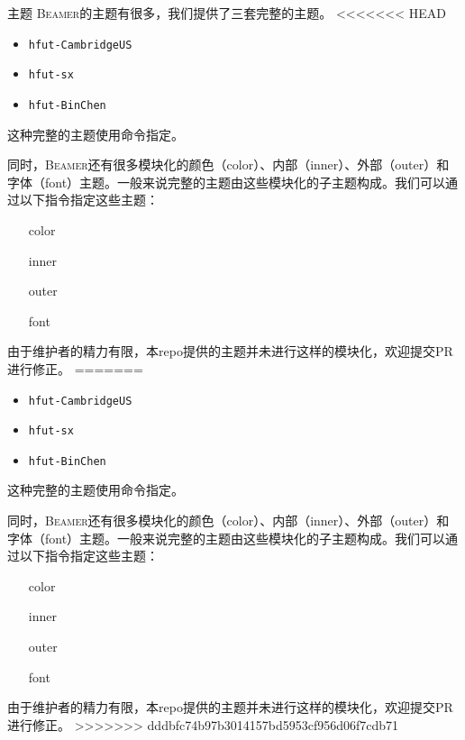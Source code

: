 \documentclass[aspectratio=169]{beamer}
\newcommand{\Beamer}{\textsc{Beamer}}
\newcommand{\enableindent}{\setlength{\parskip}{6pt}\setlength{\parindent}{2em}}
\begin{document}
\begin{frame}{主题}
	\enableindent
	\Beamer 的主题有很多，我们提供了三套完整的主题。
<<<<<<< HEAD
	\begin{itemize}
		\item \texttt{hfut-CambridgeUS}
		\item \texttt{hfut-sx}
		\item \texttt{hfut-BinChen}
	\end{itemize}

	这种完整的主题使用\texttt{\usetheme}命令指定。

	\framebreak

	同时，\Beamer 还有很多模块化的颜色（color）、内部（inner）、外部（outer）和字体（font）主题。一般来说完整的主题由这些模块化的子主题构成。我们可以通过以下指令指定这些主题：
	\begin{itemize}
		\item[color] \texttt{\usecolortheme}
		\item[inner] \texttt{\useinnertheme}
		\item[outer] \texttt{\useoutertheme}
		\item[font] \texttt{\usefonttheme}
	\end{itemize}

	由于维护者的精力有限，本repo提供的主题并未进行这样的模块化，欢迎提交PR进行修正。
=======
\begin{itemize}
	\item \texttt{hfut-CambridgeUS}
	\item \texttt{hfut-sx}
	\item \texttt{hfut-BinChen}
\end{itemize}

这种完整的主题使用\texttt{\usetheme}命令指定。

\framebreak

同时，\Beamer 还有很多模块化的颜色（color）、内部（inner）、外部（outer）和字体（font）主题。一般来说完整的主题由这些模块化的子主题构成。我们可以通过以下指令指定这些主题：
\begin{itemize}
	\item[color] \texttt{\usecolortheme}
	\item[inner] \texttt{\useinnertheme}
	\item[outer] \texttt{\useoutertheme}
	\item[font] \texttt{\usefonttheme}
\end{itemize}

由于维护者的精力有限，本repo提供的主题并未进行这样的模块化，欢迎提交PR进行修正。
>>>>>>> dddbfc74b97b3014157bd5953cf956d06f7cdb71

\end{frame}
\end{document}
